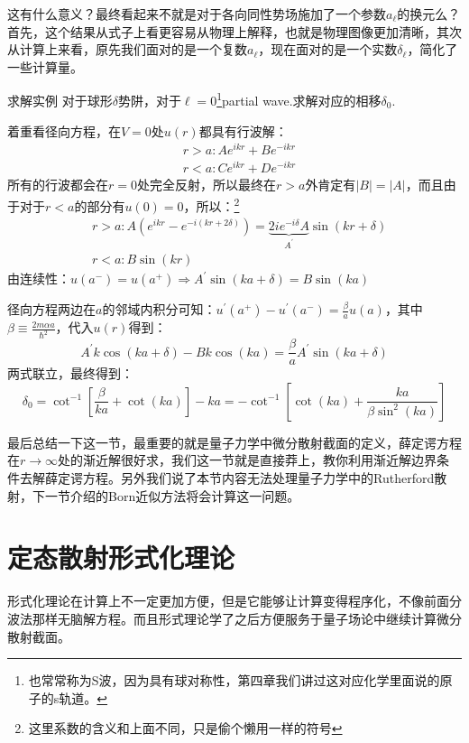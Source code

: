 \documentclass[a4paper,zihao=-4,linespread=1]{ctexrep}
\begin{document}
	这有什么意义？最终看起来不就是对于各向同性势场施加了一个参数$a_\ell$的换元么？首先，这个结果从式子上看更容易从物理上解释，也就是物理图像更加清晰，其次从计算上来看，原先我们面对的是一个复数$a_\ell$，现在面对的是一个实数$\delta_\ell$，简化了一些计算量。
	
	\begin{example}{求解实例}
		对于球形$\delta$势阱，对于$\ell=0$\footnote{也常常称为S波，因为具有球对称性，第四章我们讲过这对应化学里面说的原子的s轨道。}partial wave.求解对应的相移$\delta_0$.
		
		着重看径向方程，在$V=0$处$u(r)$都具有行波解：
		\begin{equation*}
			\begin{aligned}
				&r>a: Ae^{ikr}+Be^{-ikr}\\
				&r<a: Ce^{ikr}+De^{-ikr}
			\end{aligned}
		\end{equation*}
		所有的行波都会在$r=0$处完全反射，所以最终在$r>a$外肯定有$|B|=|A|$，而且由于对于$r<a$的部分有$u(0)=0$，所以：\footnote{这里系数的含义和上面不同，只是偷个懒用一样的符号}
		\begin{equation*}
			\begin{aligned}
				&r>a: A\left(e^{ikr}-e^{-i(kr+2\delta)}\right)=\underbrace{2ie^{-i\delta}A}_{A^\prime}\sin(kr+\delta)\\
				&r<a: B\sin (kr)
			\end{aligned}
		\end{equation*}
		由连续性：$u(a^-)=u(a^+)\Rightarrow A^\prime\sin(ka+\delta)=B\sin(ka)$
		
		\setlength\parindent{2em}径向方程两边在$a$的邻域内积分可知：$u^\prime(a^+)-u^\prime(a^-)=\frac{\beta}{a}u(a)$，其中$\beta\equiv \frac{2m\alpha a}{\hbar^2}$，代入$u(r)$得到：
		\[A^\prime k\cos(ka+\delta)-Bk\cos(ka)=\frac{\beta}{a}A^\prime\sin(ka+\delta)\]
		两式联立，最终得到：
		\[\delta _0=\cot^{-1}\left[\frac{\beta}{ka}+\cot(ka)\right]-ka= -\cot^{-1}\left[\cot(ka)+\frac{ka}{\beta\sin^2(ka)}\right]\]
	\end{example}
	
	最后总结一下这一节，最重要的就是量子力学中微分散射截面的定义，薛定谔方程在$r\to\infty$处的渐近解很好求，我们这一节就是直接莽上，教你利用渐近解边界条件去解薛定谔方程。另外我们说了本节内容无法处理量子力学中的Rutherford散射，下一节介绍的Born近似方法将会计算这一问题。
	
	\section{定态散射形式化理论}
	形式化理论在计算上不一定更加方便，但是它能够让计算变得程序化，不像前面分波法那样无脑解方程。而且形式理论学了之后方便服务于量子场论中继续计算微分散射截面。
\end{document}
